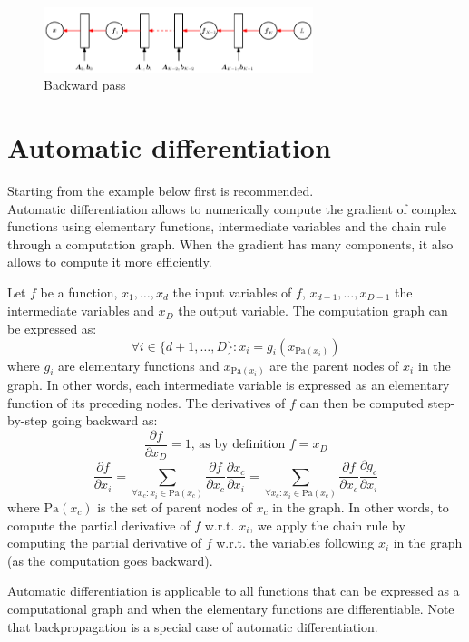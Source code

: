 \begin{figure}[ht]
    \centering
    \includegraphics[width=0.7\textwidth]{img/_backward_pass.pdf}
    \caption{Backward pass}
\end{figure}



\section{Automatic differentiation}
Starting from the example below first is recommended.\\

Automatic differentiation allows to numerically compute 
the gradient of complex functions using elementary functions, intermediate variables and the chain rule through a computation graph.
When the gradient has many components, it also allows to compute it more efficiently.

Let $f$ be a function,
$x_1, \dots, x_d$ the input variables of $f$,
$x_{d+1}, \dots, x_{D-1}$ the intermediate variables and
$x_D$ the output variable.
The computation graph can be expressed as:
\[
    \forall i \in \{ d+1, \dots, D \}: x_i = g_i(x_{\text{Pa}(x_i)})
\]
where $g_i$ are elementary functions and $x_{\text{Pa}(x_i)}$ are the parent nodes of $x_i$ in the graph.
In other words, each intermediate variable is expressed as an elementary function of its preceding nodes.
The derivatives of $f$ can then be computed step-by-step going backward as:
\[ \frac{\partial f}{\partial x_D} = 1 \text{, as by definition } f = x_D \]
\[ 
    \frac{\partial f}{\partial x_i} = \sum_{\forall x_c: x_i \in \text{Pa}(x_c)} \frac{\partial f}{\partial x_c} \frac{\partial x_c}{\partial x_i}
        = \sum_{\forall x_c: x_i \in \text{Pa}(x_c)} \frac{\partial f}{\partial x_c} \frac{\partial g_c}{\partial x_i}
\]
where $\text{Pa}(x_c)$ is the set of parent nodes of $x_c$ in the graph.
In other words, to compute the partial derivative of $f$ w.r.t. $x_i$, 
we apply the chain rule by computing 
the partial derivative of $f$ w.r.t. the variables following $x_i$ in the graph (as the computation goes backward).

Automatic differentiation is applicable to all functions that can be expressed as a computational graph and 
when the elementary functions are differentiable.
Note that backpropagation is a special case of automatic differentiation.

